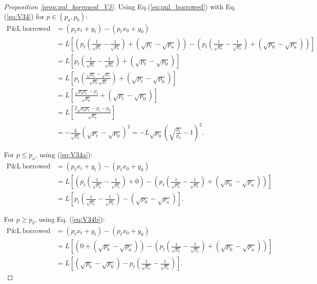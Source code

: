 \documentclass[pdftex,11pt,a4paper] {article}
\begin{document}
\begin{proof} [Proposition \ref{prop:pnl_borrowed_V3}]
Using Eq.(\ref{eq:pnl_borrowed}) with Eq.(\ref{eq:V34}) for $p \in (p_{a}, p_{b})$:
\begin{equation} \label{eq:V37}
\begin{split}
\mathrm{P\&L \ borrowed} & = \left(p_{t} x_{t} + y_{t} \right) - \left(p_{t} x_{0} + y_{0}\right)\\
& = L \left[ \left(p_{t} \left(\frac{1}{\sqrt{p_{t}}} - \frac{1}{\sqrt{p_{b}}}\right) + \left(\sqrt{p_{t}} - \sqrt{p_{a}}\right) \right) - \left(p_{t} \left(\frac{1}{\sqrt{p_{0}}} - \frac{1}{\sqrt{p_{b}}}\right)  + \left(\sqrt{p_{0}} - \sqrt{p_{a}}\right)\right) \right]\\
& = L \left[ p_{t} \left(\frac{1}{\sqrt{p_{t}}} - \frac{1}{\sqrt{p_{0}}}\right) + \left(\sqrt{p_{t}} - \sqrt{p_{0}}\right)  \right]\\
& = L \left[ p_{t} \left(\frac{\sqrt{p_{0}}-\sqrt{p_{t}}}{\sqrt{p_{0}}\sqrt{p_{t}}}\right) + \left(\sqrt{p_{t}} - \sqrt{p_{0}}\right)  \right]\\
& = L \left[  \frac{\sqrt{p_{0}p_{t}}-p_{t}}{\sqrt{p_{0}}} + \left(\sqrt{p_{t}} - \sqrt{p_{0}}\right)  \right]\\
& = L \left[  \frac{2\sqrt{p_{0}p_{t}}-p_{t}-p_{0}}{\sqrt{p_{0}}} \right]\\
& =  - \frac{L}{\sqrt{p_{0}}}  \left(\sqrt{p_{t}}-\sqrt{p_{0}}\right)^{2} =  -  L \sqrt{p_{0}} \left(\sqrt{\frac{p_{t}}{p_{0}}}-1\right)^{2}.
\end{split}
\end{equation}

For $p \leq p_{a}$, using (\ref{eq:V34a}):
\begin{equation} \label{eq:V37a}
\begin{split}
\mathrm{P\&L \ borrowed} & = \left(p_{t} x_{t} + y_{t} \right) - \left(p_{t} x_{0} + y_{0}\right)\\
& = L \left[ \left(p_{t} \left(\frac{1}{\sqrt{p_{a}}} - \frac{1}{\sqrt{p_{b}}}\right) +0\right) - \left(p_{t} \left(\frac{1}{\sqrt{p_{0}}} - \frac{1}{\sqrt{p_{b}}}\right)  + \left(\sqrt{p_{0}} - \sqrt{p_{a}}\right)\right) \right]\\
& = L \left[  p_{t} \left(\frac{1}{\sqrt{p_{a}}} - \frac{1}{\sqrt{p_{0}}}\right)   - \left(\sqrt{p_{0}} - \sqrt{p_{a}}\right) \right].
\end{split}
\end{equation}


For $p  \geq  p_{b}$, using Eq. (\ref{eq:V34b}):
\begin{equation} \label{eq:V37b}
\begin{split}
\mathrm{ P\&L \ borrowed} & = \left(p_{t} x_{t} + y_{t} \right) - \left(p_{t} x_{0} + y_{0}\right)\\
& = L\left[ \left(0 + \left(\sqrt{p_{b}} - \sqrt{p_{a}}\right) \right) - \left(p_{t} \left(\frac{1}{\sqrt{p_{0}}} - \frac{1}{\sqrt{p_{b}}}\right)  + \left(\sqrt{p_{0}} - \sqrt{p_{a}}\right)\right)\right]\\
& = L\left[   \left(\sqrt{p_{b}} - \sqrt{p_{0}}\right)- p_{t} \left(\frac{1}{\sqrt{p_{0}}} - \frac{1}{\sqrt{p_{b}}}\right) \right].
\end{split}
\end{equation}


\end{proof}
\end{document}
